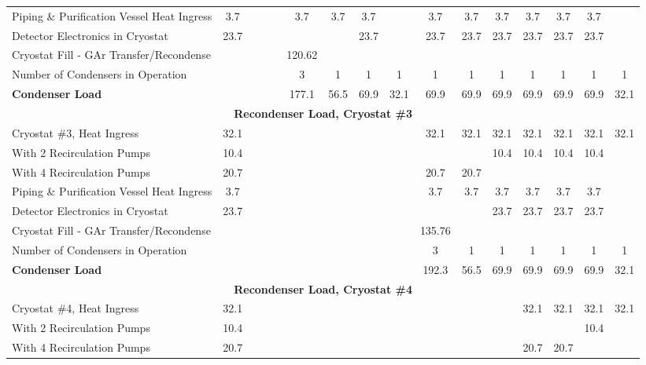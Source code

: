 \begin{table}
{\begin{tabular}[htbp]{|l|c|c|c|c|c|c|c|c||c|c|c|c|c|c|c|}
Piping \& Purification Vessel Heat Ingress & 3.7 &   &   &   & 3.7 & 3.7 & 3.7 &  & 3.7 & 3.7 & 3.7 & 3.7 & 3.7 & 3.7 &       \\
Detector Electronics in Cryostat & 23.7 &   &   &   &   &   & 23.7 &   & 23.7 & 23.7 & 23.7 & 23.7 & 23.7 & 23.7 &        \\
Cryostat Fill - GAr Transfer/Recondense & &  & & & 120.62 & & &  & & & & & & &              \\
\hline
Number of Condensers in Operation & &  &  &  & 3 & 1 & 1 & 1 & 1 & 1 & 1 & 1 & 1 & 1 & 1 \\
\textbf{Condenser Load} & &   &   &   & 177.1 & 56.5 & 69.9 & 32.1 & 69.9 & 69.9 & 69.9 & 69.9 & 69.9 & 69.9 & 32.1 \\
\hline\hline
\multicolumn{16}{|c|}{\textbf{Recondenser Load, Cryostat \#3}}                          \\
\hline
Cryostat \#3, Heat Ingress & 32.1 &  & &  &  &  &  &  & 32.1 & 32.1 & 32.1 & 32.1 & 32.1 & 32.1 & 32.1 \\     
With 2 Recirculation Pumps & 10.4  &   &   &  &   &   &   &   & & & 10.4 & 10.4 & 10.4 & 10.4 & \\ 
With 4 Recirculation Pumps & 20.7 &   &   &  &    &  &  &  & 20.7 & 20.7 & & & & & \\ 
Piping \& Purification Vessel Heat Ingress & 3.7 &  &  &  &  &  &  &  & 3.7 & 3.7 & 3.7 & 3.7 & 3.7 & 3.7 &       \\
Detector Electronics in Cryostat & 23.7  & & & & &  &  &  & & & 23.7 & 23.7 & 23.7 & 23.7 &         \\
Cryostat Fill - GAr Transfer/Recondense & & & & & & & & & 135.76 & & & & & &               \\
\hline
Number of Condensers in Operation & &  &  &  &  &  &  &  & 3  & 1 & 1 & 1 & 1 & 1 & 1 \\
\textbf{Condenser Load} & &   &   &   &   &   &   &   & 192.3 & 56.5 & 69.9 & 69.9 & 69.9 & 69.9 & 32.1 \\
\hline\hline
\multicolumn{16}{|c|}{\textbf{Recondenser Load, Cryostat \#4}} \\
\hline
Cryostat \#4, Heat Ingress & 32.1 &  &   &   &  &  &  &  & & & & 32.1 & 32.1 & 32.1 & 32.1\\     
With 2 Recirculation Pumps &  10.4 &      &      &      &      &      &      &  & & & & & & 10.4 &    \\ 
With 4 Recirculation Pumps & 20.7 &      &      &      &      &      &      &  & & & & 20.7 & 20.7 & &    \\ 

\end{tabular}}
\end{table}
